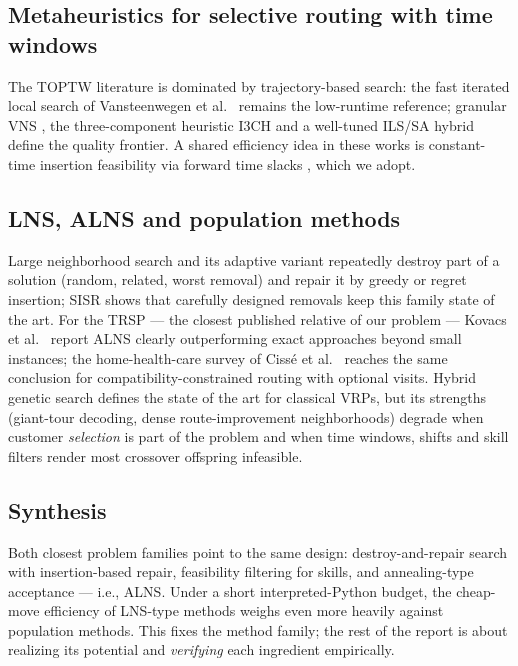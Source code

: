 \documentclass[10pt, a4paper]{article}
\begin{document}
\subsection{Metaheuristics for selective routing with time windows}
The TOPTW literature is dominated by trajectory-based search: the fast
iterated local search of Vansteenwegen et al.~\cite{vansteenwegen2009}
remains the low-runtime reference; granular VNS \cite{labadie2012}, the
three-component heuristic I3CH \cite{hu2014} and a well-tuned ILS/SA hybrid
\cite{gunawan2017} define the quality frontier. A shared efficiency idea in
these works is constant-time insertion feasibility via forward time slacks
\cite{savelsbergh1992,vansteenwegen2009}, which we adopt.

\subsection{LNS, ALNS and population methods}
Large neighborhood search \cite{shaw1998} and its adaptive variant
\cite{ropke2006,pisinger2007} repeatedly destroy part of a solution (random,
related, worst removal) and repair it by greedy or regret insertion; SISR
\cite{christiaens2020} shows that carefully designed removals keep this
family state of the art. For the TRSP --- the closest published relative of
our problem --- Kovacs et al.~\cite{kovacs2012} report ALNS clearly
outperforming exact approaches beyond small instances; the home-health-care
survey of Ciss\'e et al.~\cite{cisse2017} reaches the same conclusion for
compatibility-constrained routing with optional visits. Hybrid genetic
search \cite{vidal2012,vidal2022} defines the state of the art for classical
VRPs, but its strengths (giant-tour decoding, dense route-improvement
neighborhoods) degrade when customer \emph{selection} is part of the problem
and when time windows, shifts and skill filters render most crossover
offspring infeasible.

\subsection{Synthesis}
Both closest problem families point to the same design: destroy-and-repair
search with insertion-based repair, feasibility filtering for skills, and
annealing-type acceptance --- i.e., ALNS. Under a short interpreted-Python
budget, the cheap-move efficiency of LNS-type methods weighs even more
heavily against population methods. This fixes the method family; the rest
of the report is about realizing its potential and \emph{verifying} each
ingredient empirically.
\end{document}
